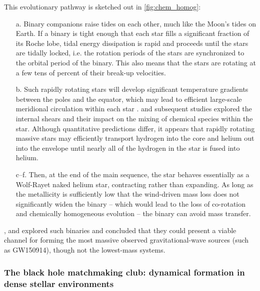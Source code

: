 \documentclass[iop,onecolumn]{revtex4}
\begin{document}
This evolutionary pathway is sketched out in \autoref{fig:chem_homog}:
\begin{itemize}
\item[a.] Binary companions raise tides on each other, much like the Moon's tides on Earth.  If a binary is tight enough that each star fills a significant fraction of its Roche lobe, tidal energy dissipation is rapid and proceeds until the stars are tidally locked, i.e. the rotation periods of the stars are synchronized to the orbital period of the binary. This also means that the stars are rotating at a few tens of percent of their break-up velocities.  
\item[b.] Such rapidly rotating stars will develop significant temperature gradients between the poles and the equator, which may lead to efficient large-scale meridional circulation within each star \citep{Eddington:1925,Sweet:1950}.  \citet{EndalSofia:1978} and subsequent studies \citep[e.g.,][]{Heger:2000,MaederMeynet:2000,Yoon:2006,Szecsi:2015} explored the internal shears and their impact on the mixing of chemical species within the star.  Although quantitative predictions differ, it appears that rapidly rotating massive stars may efficiently transport hydrogen into the core and helium out into the envelope until nearly all of the hydrogen in the star is fused into helium.  
\item[c--f.] Then, at the end of the main sequence, the star behaves essentially as a Wolf-Rayet naked helium star, contracting rather than expanding. As long as the metallicity is sufficiently low that the wind-driven mass loss does not significantly widen the binary -- which would lead to the loss of co-rotation and chemically homogeneous evolution \citep{deMink:2009} -- the binary can avoid mass transfer.  
\end{itemize}

\citet{MandeldeMink:2016,deMinkMandel:2016}, and \citet{Marchant:2016} explored such binaries and concluded that they could present a viable channel for forming the most massive observed gravitational-wave sources (such as GW150914), though not the lowest-mass systems.  

\subsubsection{The black hole matchmaking club: dynamical formation in dense stellar environments}
\end{document}
